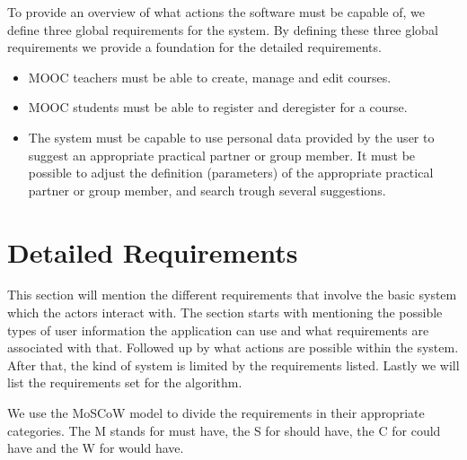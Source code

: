 To provide an overview of what actions the software must be capable of, we define three global requirements for the system.
By defining these three global requirements we provide a foundation for the detailed requirements.
\begin{itemize}
\item MOOC teachers must be able to create, manage and edit courses.

\item MOOC students must be able to register and deregister for a course.

\item The system must be capable to use personal data provided by the user to suggest an appropriate practical partner or group member.
It must be possible to adjust the definition (parameters) of the appropriate practical partner or group member, and search trough several suggestions.
\end{itemize}

\section{Detailed Requirements}
This section will mention the different requirements that involve the basic system which the actors interact with.
The section starts with mentioning the possible types of user information the application can use and what requirements are associated with that.
Followed up by what actions are possible within the system.
After that, the kind of system is limited by the requirements listed.
Lastly we will list the requirements set for the algorithm.

We use the MoSCoW model to divide the requirements in their appropriate categories.
The M stands for must have, the S for should have, the C for could have and the W for would have.\cite{moscow}

